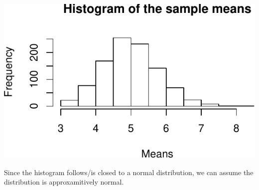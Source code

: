 \documentclass[]{article}
\begin{document}
\includegraphics{statinference-courseproject-1-Question-1_files/figure-latex/unnamed-chunk-7-1.pdf}

Since the histogram follows/is closed to a normal distribution, we can
assume the distribution is approxamitively normal.
\end{document}
